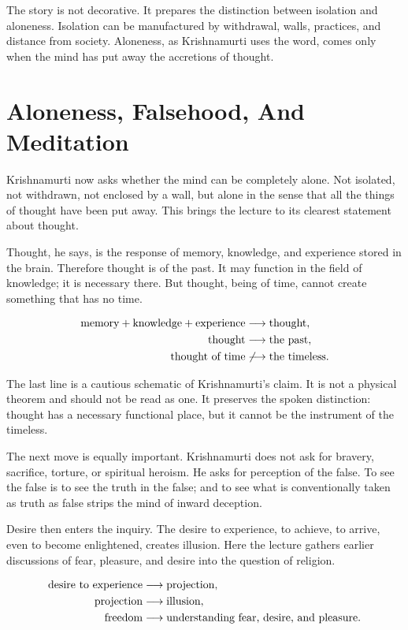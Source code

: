 The story is not decorative. It prepares the distinction between isolation and aloneness. Isolation can be manufactured by withdrawal, walls, practices, and distance from society. Aloneness, as Krishnamurti uses the word, comes only when the mind has put away the accretions of thought.

\section{Aloneness, Falsehood, And Meditation}

Krishnamurti now asks whether the mind can be completely alone. Not isolated, not withdrawn, not enclosed by a wall, but alone in the sense that all the things of thought have been put away. This brings the lecture to its clearest statement about thought.

Thought, he says, is the response of memory, knowledge, and experience stored in the brain. Therefore thought is of the past. It may function in the field of knowledge; it is necessary there. But thought, being of time, cannot create something that has no time.

\begin{align}
\hbox{memory} + \hbox{knowledge} + \hbox{experience}
&\longrightarrow \hbox{thought},\\
\hbox{thought}
&\longrightarrow \hbox{the past},\\
\hbox{thought of time}
&\not\longrightarrow \hbox{the timeless}.
\end{align}

The last line is a cautious schematic of Krishnamurti's claim. It is not a physical theorem and should not be read as one. It preserves the spoken distinction: thought has a necessary functional place, but it cannot be the instrument of the timeless.

The next move is equally important. Krishnamurti does not ask for bravery, sacrifice, torture, or spiritual heroism. He asks for perception of the false. To see the false is to see the truth in the false; and to see what is conventionally taken as truth as false strips the mind of inward deception.

Desire then enters the inquiry. The desire to experience, to achieve, to arrive, even to become enlightened, creates illusion. Here the lecture gathers earlier discussions of fear, pleasure, and desire into the question of religion.

\begin{align}
\hbox{desire to experience}
&\longrightarrow \hbox{projection},\\
\hbox{projection}
&\longrightarrow \hbox{illusion},\\
\hbox{freedom}
&\longrightarrow \hbox{understanding fear, desire, and pleasure}.
\end{align}

